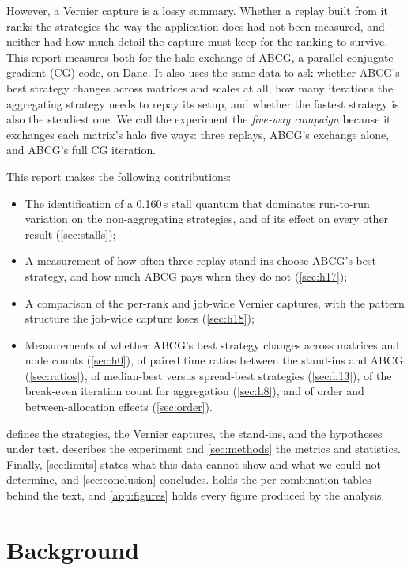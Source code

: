 \documentclass[11pt]{article}
\begin{document}
However, a Vernier capture is a lossy summary. Whether a replay built from it ranks the
strategies the way the application does had not been measured, and neither had how much
detail the capture must keep for the ranking to survive. This report measures both for
the halo exchange of ABCG, a parallel conjugate-gradient (CG) code, on Dane. It also uses
the same data to ask whether ABCG's best strategy changes across matrices and scales at
all, how many iterations the aggregating strategy needs to repay its setup, and whether
the fastest strategy is also the steadiest one. We call the experiment the
\emph{five-way campaign} because it exchanges each matrix's halo five ways: three replays,
ABCG's exchange alone, and ABCG's full CG iteration.

This report makes the following contributions:
\begin{itemize}
\item The identification of a 0.160\,s stall quantum that dominates run-to-run variation on
the non-aggregating strategies, and of its effect on every other result
(\cref{sec:stalls});
\item A measurement of how often three replay stand-ins choose ABCG's best strategy, and
how much ABCG pays when they do not (\cref{sec:h17});
\item A comparison of the per-rank and job-wide Vernier captures, with the pattern
structure the job-wide capture loses (\cref{sec:h18});
\item Measurements of whether ABCG's best strategy changes across matrices and node
counts (\cref{sec:h0}), of paired time ratios between the stand-ins and ABCG
(\cref{sec:ratios}), of median-best versus spread-best strategies (\cref{sec:h13}), of the
break-even iteration count for aggregation (\cref{sec:h8}), and of order and
between-allocation effects (\cref{sec:order}).
\end{itemize}
 defines the strategies, the Vernier captures, the stand-ins, and the
hypotheses under test.  describes the experiment and \cref{sec:methods}
the metrics and statistics. Finally, \cref{sec:limits} states what this data cannot show
and what we could not determine, and \cref{sec:conclusion} concludes.
 holds the per-combination tables behind the text, and \cref{app:figures}
holds every figure produced by the analysis.

\section{Background}
\label{sec:background}
\end{document}
